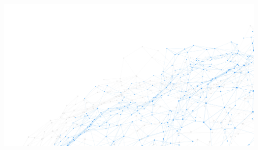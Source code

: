 \documentclass[8pt, aspectratio=169, handout]{beamer}
\begin{document}
\begin{frame}[plain]
  \begin{backgroundblock} 
    \includegraphics[width=\paperwidth]{img/network.jpg} 
  \end{backgroundblock} 
\titlepage
\end{frame}
\addtocounter{framenumber}{-1}
\end{document}
